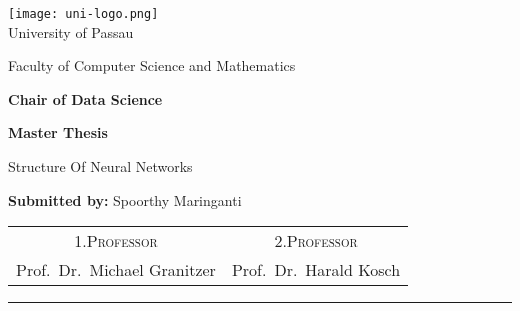 \begin{titlepage}
    \centering
    \begin{onehalfspace}
    	
        	\texttt{[image: uni-logo.png]}\\
        	\vspace{1.0cm}
        	\LARGE{University of Passau}
        	
        	\LARGE{Faculty of Computer Science and Mathematics}
        	
        	\LARGE {\bfseries Chair of Data Science }\\
        	\usepackage{	Prof.~Dr.~Michael Granitzer}

        	\vspace{2.5cm}
        	  \LARGE{\bfseries Master Thesis }\\


            \begin{doublespace}
            	{\textsf{\Huge{Structure Of Neural Networks}}}
            \end{doublespace}

        	\vspace{1cm}
            
            \large{\bfseries Submitted by:}
        	\vspace{1cm}
            \large{Spoorthy Maringanti}
             \vfill
             \thedate

        	{\large
        		\begin{tabular}[l]{cc}
        			\textsc{1.Professor} & \textsc{2.Professor} \\
        			Prof.~Dr.~Michael Granitzer& Prof.~Dr.~Harald Kosch
        		\end{tabular}
        	}

        	\vspace{1cm}
        	\parbox{\linewidth}{\hrule\strut}
        	\vfill
        
    \end{onehalfspace}
\end{titlepage}
